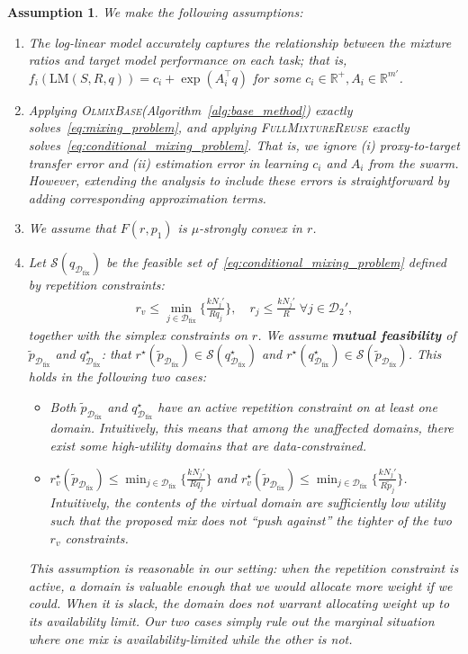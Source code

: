 \documentclass[table]{ai2style/ai2}
\newtheorem{assumption}{Assumption}
\newcommand{\D}[0]{\mathcal{D}}
\newcommand{\R}[0]{\mathbb{R}}
\newcommand{\LM}[0]{\text{LM}}
\newcommand{\Dfix}[0]{\mathcal{D}_{\text{fix}}}
\newcommand{\base}[0]{\textsc{OlmixBase}\xspace}
\newcommand{\fullmixreuse}[0]{\textsc{FullMixtureReuse}\xspace}
\begin{document}
\begin{assumption}\label{ass:1}
    We make the following assumptions:
    \begin{enumerate}
    
    \item The log-linear model accurately captures the relationship between the mixture ratios and target model performance on each task; that is, $f_i(\LM(S, R, q)) = c_i + \exp(A_i^\top q)$ for some $c_i \in \R^+, A_i \in \R^{m'}$.
    \item Applying \base (Algorithm~\ref{alg:base_method}) exactly solves~\eqref{eq:mixing_problem}, and applying \fullmixreuse exactly solves~\eqref{eq:conditional_mixing_problem}. That is, we ignore (i) proxy-to-target transfer error and (ii) estimation error in learning $c_i$ and $A_i$ from the swarm. However, extending the analysis to include these errors is straightforward by adding corresponding approximation terms.
    \item We assume that $F(r, p_1)$ is $\mu$-strongly convex in $r$.
    \item Let $\mathcal{S}(q_{\Dfix})$ be the feasible set of~\eqref{eq:conditional_mixing_problem} defined by repetition constraints:
    \begin{align*}
        r_v \le \min_{j \in \Dfix} \bigg\{\frac{k N_j'}{R q_j}\bigg\}, \quad r_j \le \frac{k N_j'}{R} \; \forall j \in \D_2',
    \end{align*}
    together with the simplex constraints on $r$. We assume \textbf{mutual feasibility} of $\tilde{p}_{\Dfix}$ and $q^\star_{\Dfix}$: that $r^\star(\tilde{p}_{\Dfix}) \in \mathcal{S}(q^\star_{\Dfix})$ and $r^\star(q^\star_{\Dfix}) \in \mathcal{S}(\tilde{p}_{\Dfix})$. This holds in the following two cases:
    \begin{itemize}
        \item Both $\tilde{p}_{\Dfix}$ and $q^\star_{\Dfix}$ have an active repetition constraint on at least one domain. Intuitively, this means that among the unaffected domains, there exist some high-utility domains that are data-constrained.
        \item $r_v^\star(\tilde{p}_{\Dfix}) \le \min_{j \in \Dfix} \{\frac{k N_j'}{ R q_j} \}$ and $r_v^\star(\tilde{p}_{\Dfix}) \le \min_{j \in \Dfix} \{\frac{k N_j'}{ R \tilde{p}_j} \}$. Intuitively, the contents of the virtual domain are sufficiently low utility such that the proposed mix does not ``push against'' the tighter of the two $r_v$ constraints. 
    \end{itemize}
    This assumption is reasonable in our setting: when the repetition constraint is active, a domain is valuable enough that we would allocate more weight if we could. When it is slack, the domain does not warrant allocating weight up to its availability limit. Our two cases simply rule out the marginal situation where one mix is availability-limited while the other is not.
    \end{enumerate}
\end{assumption}
\end{document}
